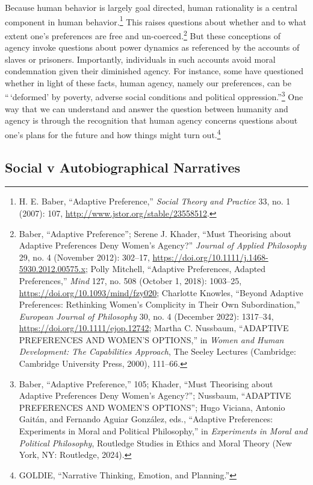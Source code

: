 \documentclass[phdthesis,12pt,final]{wuthesis}
\theoremstyle{definition}
\theoremstyle{definition}
\theoremstyle{definition}
\theoremstyle{definition}
\theoremstyle{remark}
\begin{document}
Because human behavior is largely goal directed, human rationality is a central component in human behavior.\footnote{H. E. Baber, {``Adaptive {Preference},''} \emph{Social Theory and Practice} 33, no. 1 (2007): 107, \url{http://www.jstor.org/stable/23558512}.} This raises questions about whether and to what extent one's preferences are free and un-coerced.\footnote{Baber, {``Adaptive {Preference}''}; Serene J. Khader, {``Must {Theorising} about {Adaptive Preferences Deny Women}'s {Agency}?''} \emph{Journal of Applied Philosophy} 29, no. 4 (November 2012): 302--17, \url{https://doi.org/10.1111/j.1468-5930.2012.00575.x}; Polly Mitchell, {``Adaptive {Preferences}, {Adapted Preferences},''} \emph{Mind} 127, no. 508 (October 1, 2018): 1003--25, \url{https://doi.org/10.1093/mind/fzy020}; Charlotte Knowles, {``Beyond Adaptive Preferences: {Rethinking} Women's Complicity in Their Own Subordination,''} \emph{European Journal of Philosophy} 30, no. 4 (December 2022): 1317--34, \url{https://doi.org/10.1111/ejop.12742}; Martha C. Nussbaum, {``{ADAPTIVE PREFERENCES AND WOMEN}'{S OPTIONS},''} in \emph{Women and Human Development: {The} Capabilities Approach}, The Seeley Lectures (Cambridge: Cambridge University Press, 2000), 111--66.} But these conceptions of agency invoke questions about power dynamics as referenced by the accounts of slaves or prisoners. Importantly, individuals in such accounts avoid moral condemnation given their diminished agency. For instance, some have questioned whether in light of these facts, human agency, namely our preferences, can be ``\,`deformed' by poverty, adverse social conditions and political oppression.''\footnote{Baber, {``Adaptive {Preference},''} 105; Khader, {``Must {Theorising} about {Adaptive Preferences Deny Women}'s {Agency}?''}; Nussbaum, {``{ADAPTIVE PREFERENCES AND WOMEN}'{S OPTIONS}''}; Hugo Viciana, Antonio Gaitán, and Fernando Aguiar González, eds., {``Adaptive {Preferences}: {Experiments} in {Moral} and {Political Philosophy},''} in \emph{Experiments in Moral and Political Philosophy}, Routledge Studies in Ethics and Moral Theory (New York, NY: Routledge, 2024).} One way that we can understand and answer the question between humanity and agency is through the recognition that human agency concerns questions about one's plans for the future and how things might turn out.\footnote{GOLDIE, {``Narrative {Thinking}, {Emotion}, and {Planning}.''}}

\subsection*{Social v Autobiographical Narratives}\label{social-v-autobiographical-narratives}
\end{document}
